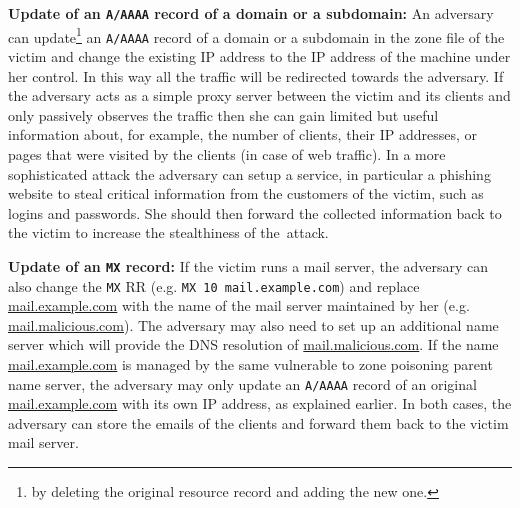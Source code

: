 \textbf{Update of an \texttt{A/AAAA} record of a domain or a subdomain:}
An adversary can update\footnote{by deleting the original resource record and adding the new one.} an \texttt{A/AAAA} record of %
a domain or a subdomain in the zone file of the victim and change the existing IP address to the IP address of the machine under her control. %
In this way all the traffic will be redirected towards the adversary.
If the adversary acts as a simple proxy server between the victim and its clients and only passively observes the traffic then she can gain limited but useful information about, %
for example, the number of clients, %
their IP addresses, or pages that were visited by the clients %
(in case of web traffic). 
In a more sophisticated attack the adversary can setup a service, in particular a phishing website to steal %
critical information from the customers of the victim, such as logins and passwords. %
She should then forward the collected information back to the %
victim to increase the stealthiness of the~attack. 

\textbf{Update of an \texttt{MX} record:} 
If the victim runs a mail server, the adversary can also change the \texttt{MX} RR (e.g. \texttt{MX  10 mail.example.com}) and replace \url{mail.example.com} with the name of the mail server maintained by her (e.g. \url{mail.malicious.com}).
The adversary may also need to set up an additional name server which will provide the DNS resolution of \url{mail.malicious.com}.
If the name \url{mail.example.com} %
is managed by the same vulnerable to zone poisoning parent name server, the adversary may only update an \texttt{A/AAAA} record of an original \url{mail.example.com} with its own IP address, as explained earlier.
In both cases, the adversary can store the emails of the clients and forward them back %
to the victim mail server.


